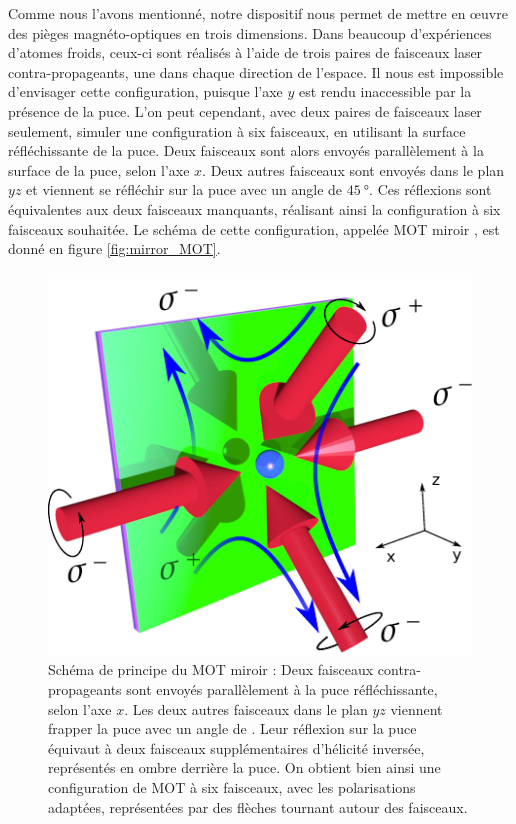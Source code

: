 Comme nous l'avons mentionné, notre dispositif nous permet de mettre en \oe uvre des pièges magnéto-optiques en trois dimensions.
Dans beaucoup d'expériences d'atomes froids, ceux-ci sont réalisés à l'aide de trois paires de faisceaux laser contra-propageants, une dans chaque direction de l'espace.
Il nous est impossible d'envisager cette configuration, puisque l'axe $y$ est rendu inaccessible par la présence de la puce.
L'on peut cependant, avec deux paires de faisceaux laser seulement, simuler une configuration à six faisceaux, en utilisant la surface réfléchissante de la puce.
Deux faisceaux sont alors envoyés parallèlement à la surface de la puce, selon l'axe $x$.
Deux autres faisceaux sont envoyés dans le plan $yz$ et viennent se réfléchir sur la puce avec un angle de $\SI{45}{\degree}$.
Ces réflexions sont équivalentes aux deux faisceaux manquants, réalisant ainsi la configuration à six faisceaux souhaitée.
Le schéma de cette configuration, appelée \og MOT miroir \fg{}, est donné en figure \eqref{fig:mirror_MOT}.

\begin{figure}[!h]
\centering
\includegraphics[width=0.6\linewidth]{figures/setup/coldatoms/mirror_MOT}
\caption[Schéma de principe du MOT miroir]{Schéma de principe du MOT miroir :
Deux faisceaux contra-propageants sont envoyés parallèlement à la puce réfléchissante, selon l'axe $x$.
Les deux autres faisceaux dans le plan $yz$ viennent frapper la puce avec un angle de .
Leur réflexion sur la puce équivaut à deux faisceaux supplémentaires d'hélicité inversée, représentés en ombre derrière la puce.
On obtient bien ainsi une configuration de MOT à six faisceaux, avec les polarisations adaptées, représentées par des flèches tournant autour des faisceaux.
}
\label{fig:mirror_MOT}
\end{figure}


